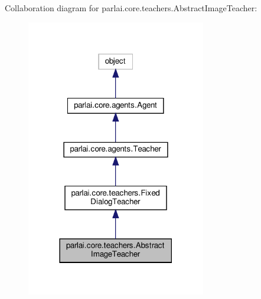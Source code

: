 Collaboration diagram for parlai.\+core.\+teachers.\+Abstract\+Image\+Teacher\+:
\nopagebreak
\begin{figure}[H]
\begin{center}
\leavevmode
\includegraphics[width=222pt]{classparlai_1_1core_1_1teachers_1_1AbstractImageTeacher__coll__graph}
\end{center}
\end{figure}

